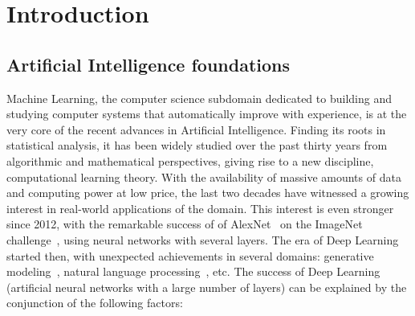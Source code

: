 \chapter{Introduction}
\minitoc
\section{Artificial Intelligence foundations}

Machine Learning, the computer science subdomain dedicated to building and studying computer systems that automatically improve with experience, is at the very core of the recent advances in Artificial Intelligence. Finding its roots in statistical analysis, it has been widely studied over the past thirty years from algorithmic and mathematical perspectives, giving rise to a new discipline, computational learning theory. With the availability of massive amounts of data and computing power at low price, the last two decades have witnessed a growing interest in  real-world applications of the domain. This interest is even stronger since 2012, with the remarkable success of of AlexNet~\citep{krizhevsky2012imagenet} on the ImageNet challenge~\citep{imagenet_cvpr09}, using neural networks with several layers. The era of Deep Learning started then, with  unexpected achievements in several domains: generative modeling~\citep{goodfellow2014generative}, natural language processing~\citep{vaswani2017attention}, etc. The success of Deep Learning (artificial neural networks with a large number of layers) can be explained by the conjunction of the following factors: 

